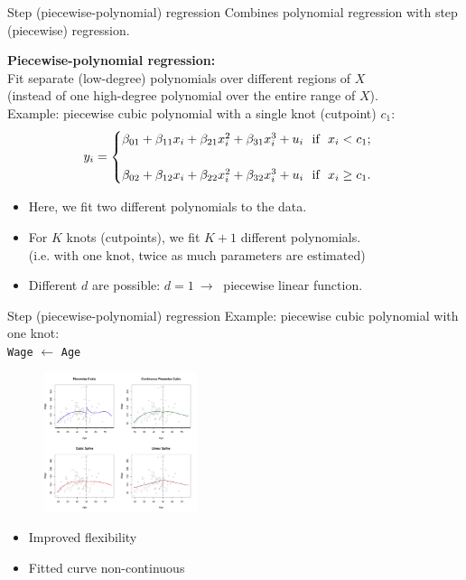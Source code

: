 \documentclass{beamer}
\begin{document}
\begin{frame}{Step (piecewise-polynomial) regression}
Combines polynomial regression with step (piecewise) regression.

\bigskip
\textbf{Piecewise-polynomial regression:} \\Fit separate (low-degree) polynomials over different regions of $X$ \\(instead of one high-degree polynomial over the entire range of $X$). \\ \bigskip
Example: piecewise cubic polynomial with a single knot (cutpoint) $c_1$:
\medskip
\begin{equation*}
y_i = 
    \begin{cases}
        \beta_{01} + \beta_{11} x_i + \beta_{21} x_i^2 + \beta_{31} x_i^3 + u_i \textnormal{~~if~~} x_i <  c_1 ;& \\ ~ & \\
         \beta_{02} + \beta_{12} x_i + \beta_{22} x_i^2 + \beta_{32} x_i^3 + u_i \textnormal{~~if~~} x_i \geq  c_1 .& 
    \end{cases}
\end{equation*}
\medskip
\begin{itemize}
    \item Here, we fit two different polynomials to the data.
    \item For $K$ knots (cutpoints), we fit $K+1$ different polynomials.\\(i.e. with one knot, twice as much parameters are estimated) 
    \item Different $d$ are possible: $d=1~\rightarrow~$ piecewise linear function.
\end{itemize}
\end{frame}
\begin{frame}{Step (piecewise-polynomial) regression}
Example: piecewise cubic polynomial with one knot:\\
\centering
\medskip
\texttt{Wage} $\leftarrow$ \texttt{Age}\\
\vspace{-0.2cm}
\begin{figure}
  \centering
  \includegraphics[trim=0cm 9.5cm 10.5cm 0cm, clip=true, width=0.4\textwidth]{IMG/ISLR73.pdf}
\end{figure}

\vspace{-0.5cm}
\begin{itemize}
    \item[\ding{51}] Improved flexibility
    \item[\ding{55}] Fitted curve non-continuous
\end{itemize}
\end{frame}
\end{document}
